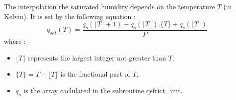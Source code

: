 The interpolation the saturated humidity depends on the temperature $T$ (in Kelvin). 
It is set by the following equation :
\begin{equation}
q_{sat}(T)= \dfrac{q_s(\lfloor T \rfloor +1) - q_s(\lfloor T \rfloor).\lbrace T \rbrace + q_s(\lfloor T \rfloor)}{P}
\end{equation}
where : \\
\begin{itemize}
 \item  $ \lfloor T \rfloor $ represents the largest integer not greater than $T$. 
 \item  $ \lbrace T \rbrace = T -\lfloor T \rfloor $ is the fractional part of $T$.
 \item  $q_s$ is the array caclulated in the subroutine qsfrict\_init. 
\end{itemize}

